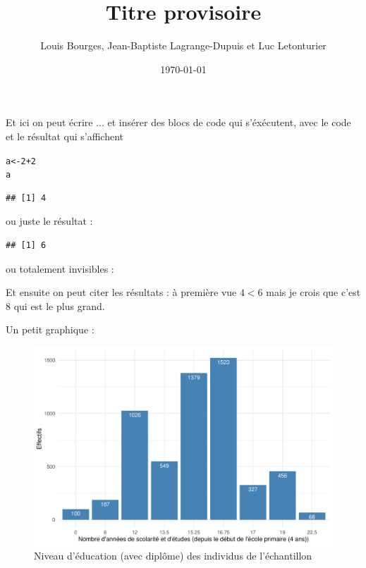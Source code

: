 \documentclass[a4paper, french, 11 pt]{article}\usepackage[]{graphicx}\usepackage[]{xcolor}
\title{Titre provisoire}
\author{Louis Bourges, Jean-Baptiste Lagrange-Dupuis et Luc Letonturier}
\date{\today}
\makeatletter
\newcommand{\hlnum}[1]{\textcolor[rgb]{0.686,0.059,0.569}{#1}}%
\newcommand{\hlopt}[1]{\textcolor[rgb]{0,0,0}{#1}}%
\newcommand{\hlstd}[1]{\textcolor[rgb]{0.345,0.345,0.345}{#1}}%
\newcommand{\hlkwb}[1]{\textcolor[rgb]{0.69,0.353,0.396}{#1}}%
\newenvironment{kframe}{%
 \def\at@end@of@kframe{}%
 \ifinner\ifhmode%
  \def\at@end@of@kframe{\end{minipage}}%
  \begin{minipage}{\columnwidth}%
 \fi\fi%
 \def\FrameCommand##1{\hskip\@totalleftmargin \hskip-\fboxsep
 \colorbox{shadecolor}{##1}\hskip-\fboxsep
     \hskip-\linewidth \hskip-\@totalleftmargin \hskip\columnwidth}%
 \MakeFramed {\advance\hsize-\width
   \@totalleftmargin\z@ \linewidth\hsize
   \@setminipage}}%
 {\par\unskip\endMakeFramed%
 \at@end@of@kframe}
\newenvironment{knitrout}{}{} %
\makeatother
\begin{document}
\maketitle

Et ici on peut écrire ... et insérer des blocs de code qui s'éxécutent, avec le code et le résultat qui s'affichent

\begin{knitrout}
\color{fgcolor}\begin{kframe}
\begin{alltt}
\hlstd{a} \hlkwb{<-}  \hlnum{2}\hlopt{+}\hlnum{2}
\hlstd{a}
\end{alltt}
\begin{verbatim}
## [1] 4
\end{verbatim}
\end{kframe}
\end{knitrout}

ou juste le résultat : 

\begin{knitrout}
\color{fgcolor}\begin{kframe}
\begin{verbatim}
## [1] 6
\end{verbatim}
\end{kframe}
\end{knitrout}

ou totalement invisibles : 


Et ensuite on peut citer les résultats : à première vue $4 < 6$ mais je crois que c'est 8 qui est le plus grand.


Un petit graphique : 



\begin{figure}[h]
\center
\includegraphics[width=0.7\linewidth]{figure/educ.pdf}
\caption{Niveau d'éducation (avec diplôme) des individus de l'échantillon}
\end{figure}
\end{document}
